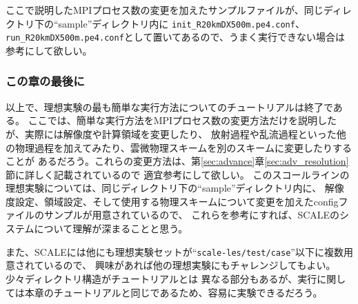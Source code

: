 ここで説明したMPIプロセス数の変更を加えたサンプルファイルが、同じディレクトリ下の``sample''ディレクトリ内に
\verb|init_R20kmDX500m.pe4.conf|、\verb|run_R20kmDX500m.pe4.conf|として置いてあるので、うまく実行できない場合は
参考にして欲しい。


\subsubsection{この章の最後に}

以上で、理想実験の最も簡単な実行方法についてのチュートリアルは終了である。
ここでは、簡単な実行方法をMPIプロセス数の変更方法だけを説明したが、実際には解像度や計算領域を変更したり、
放射過程や乱流過程といった他の物理過程を加えてみたり、雲微物理スキームを別のスキームに変更したりすることが
あるだろう。これらの変更方法は、第\ref{sec:advance}章\ref{sec:adv_resolution}節に詳しく記載されているので
適宜参考にして欲しい。
このスコールラインの理想実験については、同じディレクトリ下の``sample''ディレクトリ内に、
解像度設定、領域設定、そして使用する物理スキームについて変更を加えたconfigファイルのサンプルが用意されているので、
これらを参考にすれば、SCALEのシステムについて理解が深まることと思う。

また、SCALEには他にも理想実験セットが``\verb|scale-les/test/case|''以下に複数用意されているので、
興味があれば他の理想実験にもチャレンジしてもよい。少々ディレクトリ構造がチュートリアルとは
異なる部分もあるが、実行に関しては本章のチュートリアルと同じであるため、容易に実験できるだろう。






